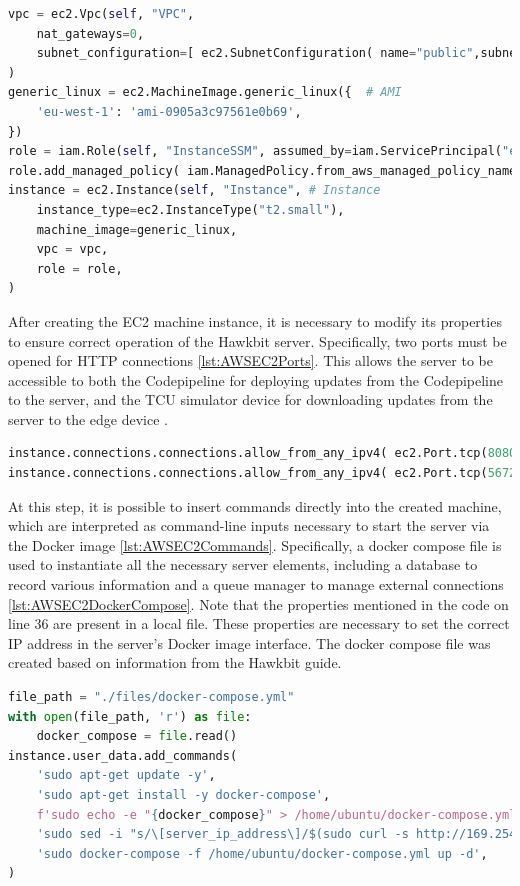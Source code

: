 \begin{lstlisting}[language=Python, caption={Code for the creation the EC2 Hawkbit server istance}, label=lst:AWSEC2Istance]
vpc = ec2.Vpc(self, "VPC",
    nat_gateways=0,
    subnet_configuration=[ ec2.SubnetConfiguration( name="public",subnet_type=ec2.SubnetType.PUBLIC ) ]
)
generic_linux = ec2.MachineImage.generic_linux({  # AMI
    'eu-west-1': 'ami-0905a3c97561e0b69',
})
role = iam.Role(self, "InstanceSSM", assumed_by=iam.ServicePrincipal("ec2.amazonaws.com")) 
role.add_managed_policy( iam.ManagedPolicy.from_aws_managed_policy_name( "AmazonSSMManagedInstanceCore" ) )
instance = ec2.Instance(self, "Instance", # Instance
    instance_type=ec2.InstanceType("t2.small"),
    machine_image=generic_linux,
    vpc = vpc,
    role = role,
)
\end{lstlisting}

After creating the EC2 machine instance, it is necessary to modify its properties to ensure correct operation of the Hawkbit server. Specifically, two ports must be opened for HTTP connections \ref{lst:AWSEC2Ports}. This allows the server to be accessible to both the Codepipeline for deploying updates from the Codepipeline to the server, and the TCU simulator device for downloading updates from the server to the edge device \cite{HawkbitDockerCompose}.
\begin{lstlisting}[language=Python, caption={Code for opening the doors}, label=lst:AWSEC2Ports]
instance.connections.connections.allow_from_any_ipv4( ec2.Port.tcp(8080), "Allow inbound HTTP traffic" )
instance.connections.connections.allow_from_any_ipv4( ec2.Port.tcp(5672), "Allow inbound HTTP traffic" )
\end{lstlisting}

At this step, it is possible to insert commands directly into the created machine, which are interpreted as command-line inputs necessary to start the server via the Docker image \ref{lst:AWSEC2Commands}. Specifically, a docker compose file is used to instantiate all the necessary server elements, including a database to record various information and a queue manager to manage external connections \ref{lst:AWSEC2DockerCompose}. Note that the properties mentioned in the code on line 36 are present in a local file. These properties are necessary to set the correct IP address in the server's Docker image interface. The docker compose file was created based on information from the Hawkbit guide.
\begin{lstlisting}[language=Python, caption={Code to run commands on the machine}, label=lst:AWSEC2Commands]
file_path = "./files/docker-compose.yml"
with open(file_path, 'r') as file:
    docker_compose = file.read()
instance.user_data.add_commands(
    'sudo apt-get update -y',
    'sudo apt-get install -y docker-compose',
    f'sudo echo -e "{docker_compose}" > /home/ubuntu/docker-compose.yml',
    'sudo sed -i "s/\[server_ip_address\]/$(sudo curl -s http://169.254.169.254/latest/meta-data/public-ipv4)/g" /home/ubuntu/docker-compose.yml',
    'sudo docker-compose -f /home/ubuntu/docker-compose.yml up -d',
)
\end{lstlisting}

